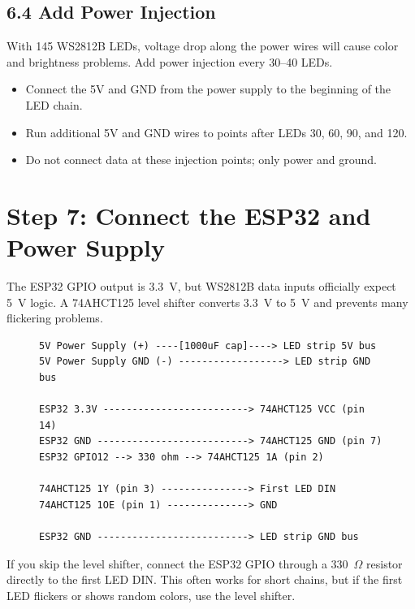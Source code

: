 \documentclass[11pt]{article}
\begin{document}
\subsection{6.4 Add Power Injection}

With 145 WS2812B LEDs, voltage drop along the power wires will cause color and brightness problems. Add power injection every 30--40 LEDs.

\begin{itemize}
    \item Connect the 5V and GND from the power supply to the beginning of the LED chain.
    \item Run additional 5V and GND wires to points after LEDs 30, 60, 90, and 120.
    \item Do not connect data at these injection points; only power and ground.
\end{itemize}

\section{Step 7: Connect the ESP32 and Power Supply}
\label{sec:wiring}

The ESP32 GPIO output is 3.3~V, but WS2812B data inputs officially expect 5~V logic. A 74AHCT125 level shifter converts 3.3~V to 5~V and prevents many flickering problems.

\begin{figure}[H]
\centering
\begin{lstlisting}[style=text,caption={Wiring diagram with 74AHCT125 level shifter.},label={lst:wiring_diagram}]
5V Power Supply (+) ----[1000uF cap]----> LED strip 5V bus
5V Power Supply GND (-) ------------------> LED strip GND bus

ESP32 3.3V -------------------------> 74AHCT125 VCC (pin 14)
ESP32 GND --------------------------> 74AHCT125 GND (pin 7)
ESP32 GPIO12 --> 330 ohm --> 74AHCT125 1A (pin 2)

74AHCT125 1Y (pin 3) ---------------> First LED DIN
74AHCT125 1OE (pin 1) --------------> GND

ESP32 GND --------------------------> LED strip GND bus
\end{lstlisting}
\end{figure}

If you skip the level shifter, connect the ESP32 GPIO through a 330~$\Omega$ resistor directly to the first LED DIN. This often works for short chains, but if the first LED flickers or shows random colors, use the level shifter.
\end{document}
